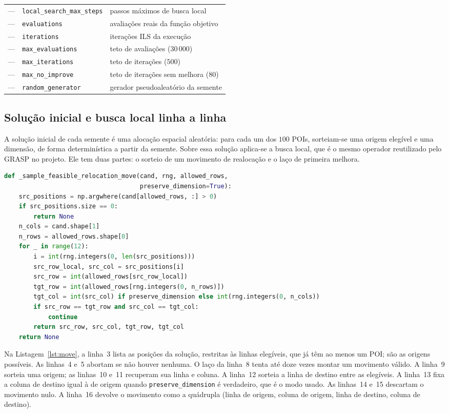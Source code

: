 \documentclass[11pt,a4paper]{article}
\newcommand{\code}[1]{\texttt{#1}}
\begin{document}
\begin{longtable}{@{}p{2.6cm} p{4.4cm} p{7.2cm}@{}}
--- & \code{local\_search\_max\_steps} & passos máximos de busca local \\
--- & \code{evaluations} & avaliações reais da função objetivo \\
--- & \code{iterations} & iterações ILS da execução \\
--- & \code{max\_evaluations} & teto de avaliações ($30\,000$) \\
--- & \code{max\_iterations} & teto de iterações ($500$) \\
--- & \code{max\_no\_improve} & teto de iterações sem melhora ($80$) \\
--- & \code{random\_generator} & gerador pseudoaleatório da semente \\
\bottomrule
\end{longtable}

\subsection{Solução inicial e busca local linha a linha}

A solução inicial de cada semente é uma alocação espacial aleatória: para cada um dos $100$ POIs, sorteiam-se uma origem elegível e uma dimensão, de forma determinística a partir da semente. Sobre essa solução aplica-se a busca local, que é o mesmo operador reutilizado pelo GRASP no projeto. Ele tem duas partes: o sorteio de um movimento de realocação e o laço de primeira melhora.

\begin{lstlisting}[language=Python,caption={Sorteio de um movimento de realocação viável.},label={lst:move}]
def _sample_feasible_relocation_move(cand, rng, allowed_rows,
                                     preserve_dimension=True):
    src_positions = np.argwhere(cand[allowed_rows, :] > 0)
    if src_positions.size == 0:
        return None
    n_cols = cand.shape[1]
    n_rows = allowed_rows.shape[0]
    for _ in range(12):
        i = int(rng.integers(0, len(src_positions)))
        src_row_local, src_col = src_positions[i]
        src_row = int(allowed_rows[src_row_local])
        tgt_row = int(allowed_rows[rng.integers(0, n_rows)])
        tgt_col = int(src_col) if preserve_dimension else int(rng.integers(0, n_cols))
        if src_row == tgt_row and src_col == tgt_col:
            continue
        return src_row, src_col, tgt_row, tgt_col
    return None
\end{lstlisting}

Na Listagem~\ref{lst:move}, a linha~3 lista as posições da solução, restritas às linhas elegíveis, que já têm ao menos um POI; são as origens possíveis. As linhas~4 e~5 abortam se não houver nenhuma. O laço da linha~8 tenta até doze vezes montar um movimento válido. A linha~9 sorteia uma origem; as linhas~10 e~11 recuperam sua linha e coluna. A linha~12 sorteia a linha de destino entre as elegíveis. A linha~13 fixa a coluna de destino igual à de origem quando \code{preserve\_dimension} é verdadeiro, que é o modo usado. As linhas~14 e~15 descartam o movimento nulo. A linha~16 devolve o movimento como a quádrupla (linha de origem, coluna de origem, linha de destino, coluna de destino).
\end{document}
